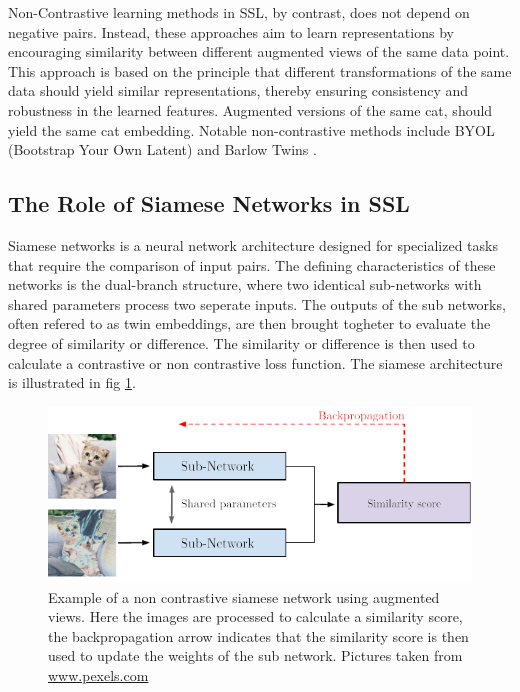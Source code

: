 Non-Contrastive learning methods in SSL, by contrast, does not depend on negative pairs. Instead, these approaches aim to learn representations by encouraging similarity between different augmented views of the same data point. 
This approach is based on the principle that different transformations of the same data should yield similar representations, thereby ensuring consistency and robustness in the learned features.
Augmented versions of the same cat, should yield the same cat embedding. Notable non-contrastive methods include BYOL (Bootstrap Your Own Latent)\cite{BYOL} and Barlow Twins \cite{Barlow}.

\subsection{The Role of Siamese Networks in SSL}
Siamese networks\cite{Siamese} is a neural network architecture designed for specialized tasks that require the comparison of input pairs. The defining characteristics of these networks is the dual-branch structure, where two identical sub-networks with shared parameters process two seperate inputs.
The outputs of the sub networks, often refered to as twin embeddings, are then brought togheter to evaluate the degree of similarity or difference. The similarity or difference is then used to calculate a contrastive or non contrastive loss function.
The siamese architecture is illustrated in fig \ref{fig:Siamese}. 

\begin{figure}[H]
    \includegraphics[scale=1]{figures/figure-pdf/Siamese.pdf}
    \caption{ Example of a non contrastive siamese network using augmented views. Here the images are processed to calculate a similarity score, the backpropagation arrow indicates that the similarity score is then used to update the weights of the sub network. Pictures taken from \url{www.pexels.com}}
    \label{fig:Siamese}
\end{figure}


